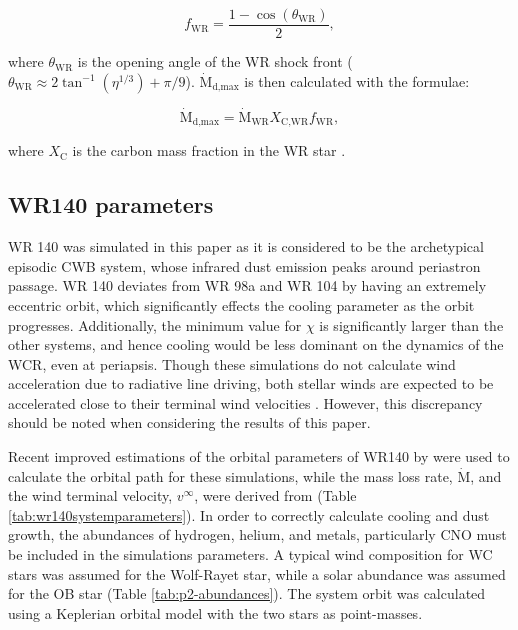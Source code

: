 \documentclass[fleqn,usenatbib]{mnras}
\newcommand{\rms}[1]{\ensuremath{_{\text{#1}}}}
\newcommand{\mdot}{\dot{\text{M}}}
\begin{document}
\begin{equation}
  f\rms{WR} = \frac{1 - \cos\left(\theta\rms{WR}\right)}{2},
\end{equation}

\noindent
where $\theta\rms{WR}$ is the opening angle of the WR shock front ($\theta\rms{WR} \approx 2 \tan^{-1}(\eta^{1/3}) + \pi/9$).
$\mdot\rms{d,max}$ is then calculated with the formulae:

\begin{equation}
  \mdot\rms{d,max} = \mdot\rms{WR} X\rms{C,WR} f\rms{WR},
\end{equation}

\noindent
where $X\rms{C}$ is the carbon mass fraction in the WR star \citep{pittardCollidingStellarWinds2018}.

\subsection{WR140 parameters}


WR 140 was simulated in this paper as it is considered to be the archetypical episodic CWB system, whose infrared dust emission peaks around periastron passage.
WR 140 deviates from WR 98a and WR 104 by having an extremely eccentric orbit, which significantly effects the cooling parameter as the orbit progresses.
Additionally, the minimum value for $\chi$ is significantly larger than the other systems, and hence cooling would be less dominant on the dynamics of the WCR, even at periapsis.
Though these simulations do not calculate wind acceleration due to radiative line driving, both stellar winds are expected to be accelerated close to their terminal wind velocities \citep{lamersIntroductionStellarWinds1999}.
However, this discrepancy should be noted when considering the results of this paper.

Recent improved estimations of the orbital parameters of WR140 by \cite{thomasOrbitStellarMasses2021} were used to calculate the orbital path for these simulations, while the mass loss rate, $\dot{\text{M}}$, and the wind terminal velocity, $v^\infty$, were derived from \cite{williamsMultifrequencyVariationsWolfrayet1990}
(Table \ref{tab:wr140systemparameters}).
In order to correctly calculate cooling and dust growth, the abundances of hydrogen, helium, and metals, particularly CNO must be included in the simulations parameters.
A typical wind composition for WC stars was assumed for the Wolf-Rayet star, while a solar abundance was assumed for the OB star (Table \ref{tab:p2-abundances}).
The system orbit was calculated using a Keplerian orbital model with the two stars as point-masses.
\end{document}
